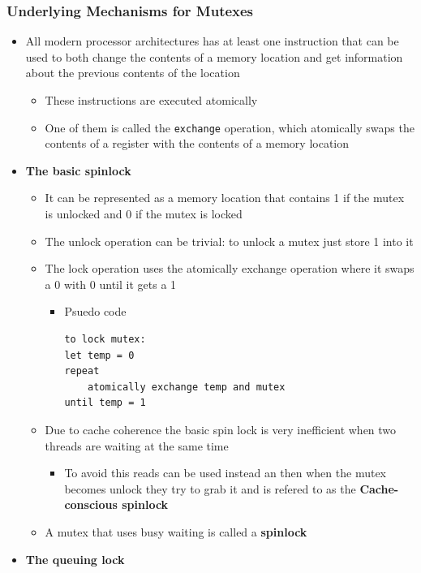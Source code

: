 \documentclass[11pt]{article}
\providecommand{\tightlist}{%
      \setlength{\itemsep}{0pt}\setlength{\parskip}{0pt}}
\begin{document}
    \subsubsection{Underlying Mechanisms for
Mutexes}\label{underlying-mechanisms-for-mutexes}

\begin{itemize}
\tightlist
\item
  All modern processor architectures has at least one instruction that
  can be used to both change the contents of a memory location and get
  information about the previous contents of the location

  \begin{itemize}
  \tightlist
  \item
    These instructions are executed atomically
  \item
    One of them is called the \texttt{exchange} operation, which
    atomically swaps the contents of a register with the contents of a
    memory location
  \end{itemize}
\item
  \textbf{The basic spinlock}

  \begin{itemize}
  \tightlist
  \item
    It can be represented as a memory location that contains 1 if the
    mutex is unlocked and 0 if the mutex is locked
  \item
    The unlock operation can be trivial: to unlock a mutex just store 1
    into it
  \item
    The lock operation uses the atomically exchange operation where it
    swaps a 0 with 0 until it gets a 1

    \begin{itemize}
    \item
      Psuedo code

\begin{verbatim}
to lock mutex:
let temp = 0
repeat
    atomically exchange temp and mutex
until temp = 1
\end{verbatim}
    \end{itemize}
  \item
    Due to cache coherence the basic spin lock is very inefficient when
    two threads are waiting at the same time

    \begin{itemize}
    \tightlist
    \item
      To avoid this reads can be used instead an then when the mutex
      becomes unlock they try to grab it and is refered to as the
      \textbf{Cache-conscious spinlock}
    \end{itemize}
  \item
    A mutex that uses busy waiting is called a \textbf{spinlock}
  \end{itemize}
\item
  \textbf{The queuing lock}


\end{itemize}
\end{document}
